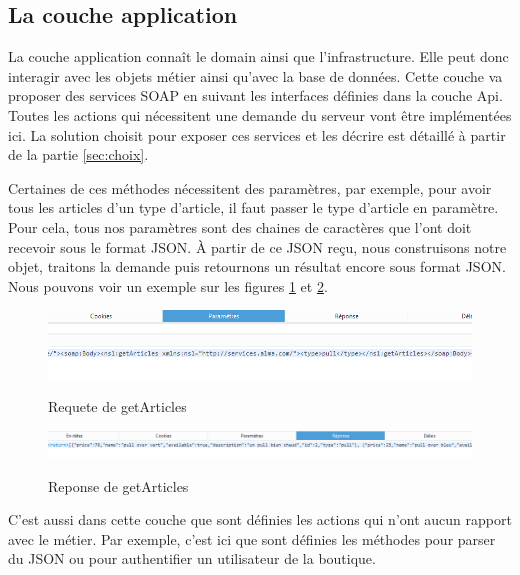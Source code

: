 \documentclass[a4paper]{article}
\begin{document}
\subsection{La couche application}
    
    La couche application connaît le domain ainsi que l'infrastructure. Elle peut donc interagir avec les objets métier ainsi qu'avec la base de données. Cette couche va proposer des services SOAP en suivant les interfaces définies dans la couche Api. Toutes les actions qui nécessitent une demande du serveur vont être implémentées ici. La solution choisit pour exposer ces services et les décrire est détaillé à partir de la partie \ref{sec:choix}.
    
    \bigskip
    
    Certaines de ces méthodes nécessitent des paramètres, par exemple, pour avoir tous les articles d'un type d'article, il faut passer le type d'article en paramètre. Pour cela, tous nos paramètres sont des chaines de caractères que l'ont doit recevoir sous le format JSON. À partir de ce JSON reçu, nous construisons notre objet, traitons la demande puis retournons un résultat encore sous format JSON. Nous pouvons voir un exemple sur les figures \ref{requete} et \ref{reponse}.
    
    \begin{figure}[H]
        \centering
        \caption{Requete de getArticles}
        \includegraphics[width=\textwidth]{requete.png}
        \label{requete}
    \end{figure}
    
    \begin{figure}[H]
        \centering
        \caption{Reponse de getArticles}
        \includegraphics[width=\textwidth]{reponse.png}
        \label{reponse}
    \end{figure}
    
    C'est aussi dans cette couche que sont définies les actions qui n'ont aucun rapport avec le métier. Par exemple, c'est ici que sont définies les méthodes pour parser du JSON ou pour authentifier un utilisateur de la boutique.
    
\end{document}
